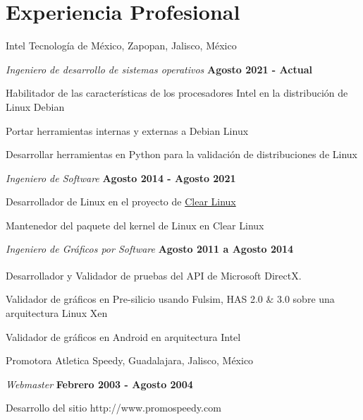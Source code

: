 \section{Experiencia Profesional}
%
Intel Tecnología de México,
Zapopan, Jalisco, México
\begin{outerlist}
\item[] \textit{Ingeniero de desarrollo de sistemas operativos}%
    \hfill \textbf{Agosto 2021 - Actual}
    \begin{innerlist}
      \item Habilitador de las características de los procesadores Intel en
	      la distribución de Linux Debian
      \item Portar herramientas internas y externas a Debian Linux
      \item Desarrollar herramientas en Python para la validación de
        distribuciones de Linux
    \end{innerlist}
\item[] \textit{Ingeniero de Software}%
    \hfill \textbf{Agosto 2014 - Agosto 2021}
    \begin{innerlist}
      \item Desarrollador de Linux en el proyecto de
	      \href{https://www.clearlinux.org/}{Clear Linux}
      \item Mantenedor del paquete del kernel de Linux en Clear Linux
    \end{innerlist}
\item[] \textit{Ingeniero de Gráficos por Software}%
    \hfill \textbf{Agosto 2011 a Agosto 2014}
    \begin{innerlist}
        \item Desarrollador y Validador de pruebas del API de
           Microsoft\textsuperscript{\textregistered}
           DirectX\textsuperscript{\textregistered}.
        \item Validador de gráficos en Pre-silicio usando Fulsim, HAS 2.0 \& 3.0
	   sobre una arquitectura Linux Xen
	\item Validador de gráficos en Android en arquitectura Intel
    \end{innerlist}
\end{outerlist}

\blankline

Promotora Atletica Speedy, Guadalajara, Jalisco, México
\begin{outerlist}
\item[] \textit{Webmaster}%
    \hfill \textbf{Febrero 2003 - Agosto 2004 }
    \begin{innerlist}
        \item Desarrollo del sitio http://www.promospeedy.com
    \end{innerlist}
\end{outerlist}

